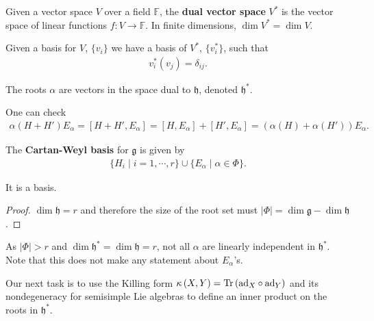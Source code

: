 \begin{definition}
    Given a vector space $V$ over a field $\mathbb{F}$, the \textbf{dual vector space} $V^{*}$ is the vector space of linear functions $f : V \to \mathbb{F}$.  In finite dimensions, $\dim V^{*} = \dim V$.
\end{definition}

Given a basis for $V$, $\{v_i\} $ we have a basis of $V^{*}$, $\{v_i^{*}\}$, such that
\begin{align}
    v_i^{*}\left( v_j \right) = \delta_{ij}
.\end{align}

\begin{claim}
    The roots $\alpha$ are vectors in the space dual to $\mathfrak{h}$, denoted $\mathfrak{h}^{*}$.
\end{claim}

One can check
\begin{align}
    \alpha \left( H + H' \right) E_\alpha = \left[ H + H', E_{\alpha} \right] = \left[ H, E_\alpha \right] + \left[ H', E_\alpha \right] = \left( \alpha \left( H \right) + \alpha \left( H' \right)  \right) E_\alpha
.\end{align}

\begin{definition}
    The \textbf{Cartan-Weyl basis} for $\mathfrak{g}$ is given by
    \begin{align}
        \{H_i  \mid i=1,\cdots, r\} \cup \{E_\alpha  \mid \alpha \in \Phi\} 
    .\end{align}
\end{definition}

\begin{claim}
    It is a basis.
\end{claim}

\begin{proof}
    $\dim \mathfrak{h} = r$ and therefore the size of the root set must $\left| \Phi \right| = \dim \mathfrak{g} - \dim \mathfrak{h}$.
\end{proof}

As $\left| \Phi \right| > r$ and $\dim \mathfrak{h}^{*} = \dim \mathfrak{h} = r$, not all $\alpha$ are linearly independent in $\mathfrak{h}^{*}$. Note that this does not make any statement about $E_\alpha$'s.

Our next task is to use the Killing form $\kappa \left( X,Y \right) = \Tr \left( \text{ad}_X \circ \text{ad}_Y \right) $ and its nondegeneracy for semisimple Lie algebras to define an inner product on the roots in $\mathfrak{h}^{*}$.

